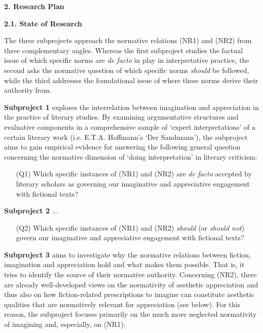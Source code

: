 \noindent\textbf{\large 2.  Research Plan}

\noindent\textbf{2.1.  State of Research}

\noindent The three subprojects approach the normative relations (NR1) and (NR2) from three complementary angles. Whereas the first subproject studies the factual issue of which specific norms are \emph{de facto} in play in interpretative practice, the second asks the normative question of which specific norms \emph{should} be followed, while the third addresses the foundational issue of where these norms derive their authority from.

\textbf{Subproject 1} explores the interrelation between imagination and appreciation in the practice of literary studies. By examining argumentative structures and evaluative components in a comprehensive sample of `expert interpretations' of a certain literary work (i.e. E.T.A. Hoffmann's `Der Sandmann'), the subproject aims to gain empirical evidence for answering the following general question concerning the normative dimension of `doing interpretation' in literary criticism:

\vspace{-.1cm}
\begin{itemize}[leftmargin=2cm]
\item[(Q1)] Which specific instances of (NR1) and (NR2) are \emph{de facto} accepted by literary scholars as governing our imaginative and appreciative engagement with fictional texts?
\end{itemize}
\vspace{-.1cm}

\noindent\textbf{Subproject 2} ...

\vspace{-.1cm}
\begin{itemize}[leftmargin=2cm]
\item[(Q2)] Which specific instances of (NR1) and (NR2) \emph{should} (or \emph{should not}) govern our imaginative and appreciative engagement with fictional texts?
\end{itemize}
\vspace{-.1cm}

\noindent\textbf{Subproject 3} aims to investigate why the normative relations between fiction, imagination and appreciation hold and what makes them possible. That is, it tries to identify the source of their normative authority. Concerning (NR2), there are already well-developed views on the normativity of aesthetic appreciation and thus also on how fiction-related prescriptions to imagine can constitute aesthetic qualities that are normatively relevant for appreciation (see below). For this reason, the subproject focuses primarily on the much more neglected normativity of imagining and, especially, on (NR1): 


